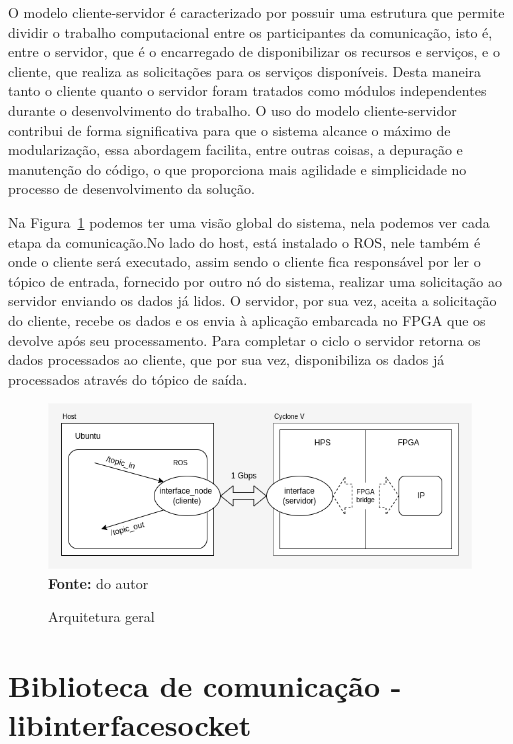 O modelo cliente-servidor é caracterizado por possuir uma estrutura que permite dividir o trabalho computacional entre os participantes da comunicação, isto é, entre o servidor, que é o encarregado de disponibilizar os recursos e serviços, e o cliente, que realiza as solicitações para os serviços disponíveis.  Desta maneira tanto o cliente quanto o servidor foram tratados como módulos independentes durante o desenvolvimento do trabalho. O uso do modelo cliente-servidor contribui de forma significativa para que o sistema alcance o máximo de modularização, essa abordagem facilita, entre outras coisas, a depuração e manutenção do código, o que proporciona mais agilidade e simplicidade no processo de desenvolvimento da solução.


Na Figura~\ref{fig:arquitetura} podemos ter uma visão global do sistema, nela podemos ver cada etapa da comunicação.No lado do host, está instalado o ROS, nele também é onde o cliente será executado, assim sendo o cliente fica responsável por ler o tópico de entrada, fornecido por outro nó do sistema, realizar uma solicitação ao servidor enviando os dados já lidos. O servidor, por sua vez, aceita a solicitação do cliente, recebe os dados e os envia à aplicação embarcada no FPGA que os devolve após seu processamento. Para completar o ciclo o servidor retorna os dados processados ao cliente, que por sua vez, disponibiliza os dados já processados através do tópico de saída. 

\begin{figure}[ht]
	\caption{Arquitetura geral}
	\begin{center}
		\includegraphics[scale=0.7]{imagens/arquitetura_geral.png}\\
		{\small \textbf{Fonte:} do autor}
    \end{center}\label{fig:arquitetura}
\end{figure}




\section{Biblioteca de comunicação - libinterfacesocket}

